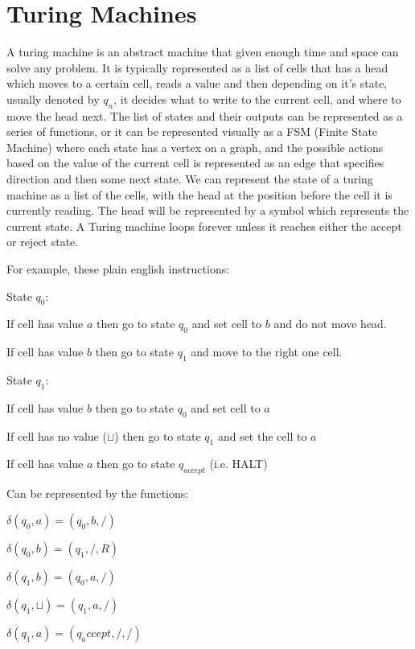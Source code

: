 \documentclass{article}
\begin{document}
\section{Turing Machines}
A turing machine is an abstract machine that given enough time and space can solve any problem. It
is typically represented as a list of cells that has a head which moves to a certain cell, reads a value
and then depending on it's state, usually denoted by $q_n$, it decides what to write to the current cell,
and where to move the head next. The list of states and their outputs can be represented as a series of functions, 
or it can be represented visually as a FSM (Finite State Machine) where each state has a vertex on a graph, and the
possible actions based on the value of the current cell is represented as an edge that specifies direction and then 
some next state. We can represent the state of a turing machine as a list of the cells, with the head at the position
before the cell it is currently reading. The head will be represented by a symbol which represents the current state.
A Turing machine loops forever unless it reaches either the accept or reject
state.

\begin{multicols}{2}
    

For example, these plain english instructions:

State $q_0$:

If cell has value $a$ then go to state $q_0$ and set cell to $b$ and do not move head.

If cell has value $b$ then go to state $q_1$ and move to the right one cell.

State $q_1$:

If cell has value $b$ then go to state $q_0$ and set cell to $a$

If cell has no value ($\sqcup$) then go to state $q_1$ and set the cell to $a$

If cell has value $a$ then go to state $q_{accept}$ (i.e. HALT)

\columnbreak

Can be represented by the functions:


$\delta(q_0, a)  = (q_0, b, /)$

$\delta(q_0, b)  = (q_1, /, R)$

$\delta(q_1, b)  = (q_0, a, /)$

$\delta(q_1, \sqcup)  = (q_1, a, /)$

$\delta(q_1, a)  = (q_accept, /, /)$

\end{multicols}
\end{document}
